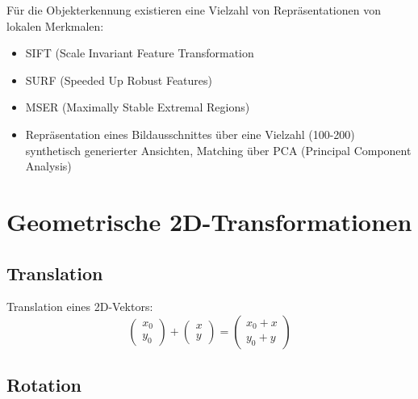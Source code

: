 Für die Objekterkennung existieren eine Vielzahl von Repräsentationen von lokalen Merkmalen:
\begin{itemize}
	\item SIFT (Scale Invariant Feature Transformation
	\item SURF (Speeded Up Robust Features)
	\item MSER (Maximally Stable Extremal Regions)
	\item Repräsentation eines Bildausschnittes über eine Vielzahl (100-200) synthetisch generierter Ansichten, Matching über PCA (Principal Component Analysis)
\end{itemize}

\section{Geometrische 2D-Transformationen}

\subsection{Translation}

Translation eines 2D-Vektors: $$\left( \begin{array}{c} x_0 \\ y_0 \end{array} \right) + \left( \begin{array}{c} x \\ y \end{array} \right) = \left( \begin{array}{c} x_0 + x \\ y_0 + y \end{array} \right)$$

\subsection{Rotation}

